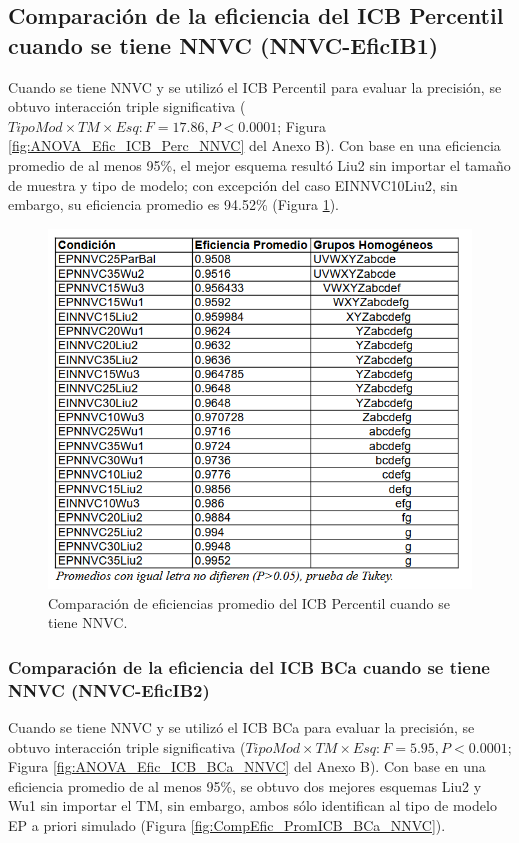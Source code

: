 
\subsection{Comparación de la eficiencia del ICB Percentil cuando se tiene NNVC (NNVC-EficIB1)}

Cuando se tiene NNVC y se utilizó el ICB Percentil para evaluar la precisión, se obtuvo interacción triple significativa ($TipoMod \times TM \times Esq: F=17.86, P<0.0001$; Figura \ref{fig:ANOVA_Efic_ICB_Perc_NNVC} del Anexo B). Con base en una eficiencia promedio de al menos 95\%, el mejor esquema resultó Liu2 sin importar el tamaño de muestra y tipo de modelo; con excepción del caso EINNVC10Liu2, sin embargo, su eficiencia promedio es 94.52\% (Figura \ref{fig:CompEfic_PromICB_Perc_NNVC}).\\

\begin{figure}[ht] 
	\centering 
	\includegraphics[width=0.76\linewidth]{img/CompEfic_PromICB_Perc_NNVC.png} 
	\caption{Comparación de eficiencias promedio del ICB Percentil cuando se tiene NNVC.} 
	\label{fig:CompEfic_PromICB_Perc_NNVC}
\end{figure}
\FloatBarrier



\subsubsection{Comparación de la eficiencia del ICB BCa cuando se tiene NNVC (NNVC-EficIB2)}

Cuando se tiene NNVC y se utilizó el ICB BCa para evaluar la precisión, se obtuvo interacción triple significativa ($TipoMod \times TM \times Esq: F=5.95, P<0.0001$; Figura \ref{fig:ANOVA_Efic_ICB_BCa_NNVC} del Anexo B). Con base en una eficiencia promedio de al menos 95\%, se obtuvo dos mejores esquemas Liu2 y Wu1 sin importar el TM, sin embargo, ambos sólo identifican al tipo de modelo EP a priori simulado (Figura \ref{fig:CompEfic_PromICB_BCa_NNVC}). \\


